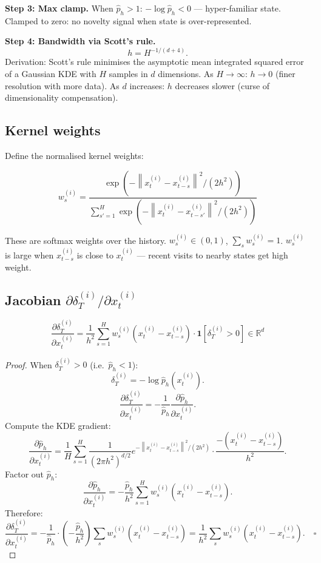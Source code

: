 \documentclass[11pt,a4paper]{article}
\theoremstyle{definition}
\newcommand{\R}{\mathbb{R}}
\newcommand{\norm}[1]{\left\|#1\right\|}
\begin{document}
\textbf{Step 3: Max clamp.}
When $\hat{p}_h > 1$: $-\log\hat{p}_h < 0$ — hyper-familiar state.
Clamped to zero: no novelty signal when state is over-represented.

\textbf{Step 4: Bandwidth via Scott's rule.}
\[
h = H^{-1/(d+4)}.
\]
Derivation: Scott's rule minimises the asymptotic mean integrated squared error
of a Gaussian KDE with $H$ samples in $d$ dimensions.
As $H \to \infty$: $h \to 0$ (finer resolution with more data).
As $d$ increases: $h$ decreases slower (curse of dimensionality compensation).

\subsection{Kernel weights}

Define the normalised kernel weights:

\begin{lockedbox}
\[
w_s^{(i)} = \frac{\exp\!\left(-\norm{x_t^{(i)}-x_{t-s}^{(i)}}^2/(2h^2)\right)}{\sum_{s'=1}^H\exp\!\left(-\norm{x_t^{(i)}-x_{t-s'}^{(i)}}^2/(2h^2)\right)}
\]
\end{lockedbox}

These are softmax weights over the history. $w_s^{(i)} \in (0,1)$, $\sum_s w_s^{(i)} = 1$.
$w_s^{(i)}$ is large when $x_{t-s}^{(i)}$ is close to $x_t^{(i)}$ — recent visits to nearby states get high weight.

\subsection{Jacobian $\partial\delta_T^{(i)}/\partial x_t^{(i)}$}

\begin{lockedbox}
\[
\frac{\partial\delta_T^{(i)}}{\partial x_t^{(i)}} = \frac{1}{h^2}\sum_{s=1}^H w_s^{(i)}\!\left(x_t^{(i)} - x_{t-s}^{(i)}\right) \cdot \mathbf{1}[\delta_T^{(i)} > 0] \in \R^d
\]
\end{lockedbox}

\begin{proof}
When $\delta_T^{(i)} > 0$ (i.e.\ $\hat{p}_h < 1$):
\[
\delta_T^{(i)} = -\log\hat{p}_h(x_t^{(i)}).
\]
\[
\frac{\partial\delta_T^{(i)}}{\partial x_t^{(i)}} = -\frac{1}{\hat{p}_h}\frac{\partial\hat{p}_h}{\partial x_t^{(i)}}.
\]
Compute the KDE gradient:
\[
\frac{\partial\hat{p}_h}{\partial x_t^{(i)}}
= \frac{1}{H}\sum_{s=1}^H \frac{1}{(2\pi h^2)^{d/2}}e^{-\norm{x_t^{(i)}-x_{t-s}^{(i)}}^2/(2h^2)}
\cdot\frac{-(x_t^{(i)}-x_{t-s}^{(i)})}{h^2}.
\]
Factor out $\hat{p}_h$:
\[
\frac{\partial\hat{p}_h}{\partial x_t^{(i)}} = -\frac{\hat{p}_h}{h^2}\sum_{s=1}^H w_s^{(i)}(x_t^{(i)}-x_{t-s}^{(i)}).
\]
Therefore:
\[
\frac{\partial\delta_T^{(i)}}{\partial x_t^{(i)}} = -\frac{1}{\hat{p}_h}\cdot\left(-\frac{\hat{p}_h}{h^2}\right)\sum_s w_s^{(i)}(x_t^{(i)}-x_{t-s}^{(i)})
= \frac{1}{h^2}\sum_s w_s^{(i)}(x_t^{(i)}-x_{t-s}^{(i)}). \quad\square
\]
\end{proof}
\end{document}
